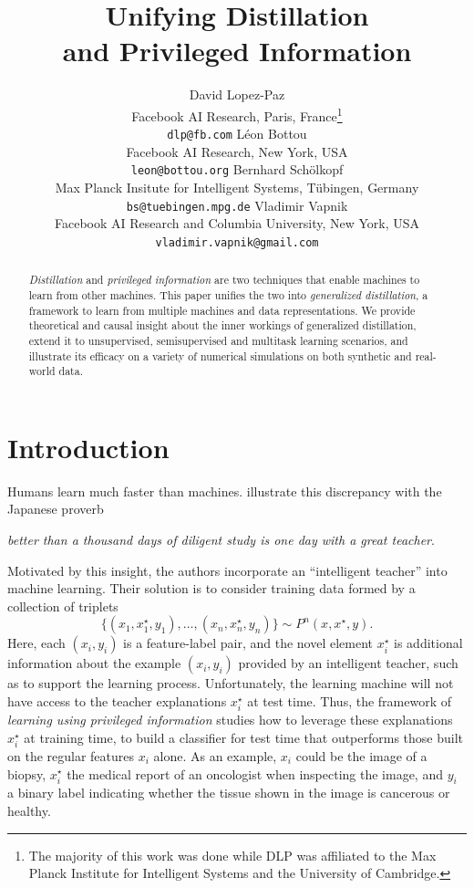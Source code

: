 \documentclass{article}
\title{Unifying Distillation\\and Privileged Information}
\author{David Lopez-Paz\\
  Facebook AI Research, Paris, France\thanks{The majority of this work was done
  while DLP was affiliated to the Max Planck Institute for Intelligent
  Systems and the University of Cambridge.}\\
  \texttt{dlp@fb.com}
  \AND
  L\'eon Bottou\\
  Facebook AI Research, New York, USA\\
  \texttt{leon@bottou.org}
  \AND
  Bernhard Sch\"olkopf\\
  Max Planck Insitute for Intelligent Systems, T\"ubingen, Germany\\
  \texttt{bs@tuebingen.mpg.de}
  \AND
  Vladimir Vapnik\\
  Facebook AI Research and Columbia University, New York, USA\\
  \texttt{vladimir.vapnik@gmail.com}
}
\begin{document}
\maketitle

\begin{abstract}
\emph{Distillation} \citep{Hinton15} and \emph{privileged information}
\citep{VapIzm15} are two techniques that enable machines to learn
from other machines. 
%
This paper unifies the two into
\emph{generalized distillation}, a framework to learn from multiple machines
and data representations.
%
We provide theoretical and causal insight about the inner workings
of generalized distillation, extend it to unsupervised, semisupervised and
multitask learning scenarios, and illustrate its efficacy on a variety of
numerical simulations on both synthetic and real-world data.
\end{abstract}

\section{Introduction}\label{sec:intro}
Humans learn much faster than machines.
\citet{VapIzm15} illustrate this discrepancy with the Japanese proverb
\begin{center}
\emph{better than a thousand days of diligent study is one day with a great
teacher}.
\end{center}
Motivated by this insight, the authors incorporate an
``intelligent teacher'' into machine learning. Their solution 
is to consider training data formed by a collection of triplets
\begin{equation*}
 \{(x_1, x^\star_1, y_1), \ldots, (x_n, x^\star_n, y_n) \} \sim P^n(x,x^\star,y).
\end{equation*}
Here, each $(x_i, y_i)$ is a feature-label pair, and the novel element
$x^\star_i$ is additional information about the example $(x_i, y_i)$ provided
by an intelligent teacher, such as to support the learning process.
Unfortunately, the learning machine will not have access to the teacher
explanations $x^\star_i$ at test time. Thus, the framework of \emph{learning
using privileged information} \citep{Vapnik09,VapIzm15} studies how to leverage
these explanations $x^\star_i$ at training time, to build a classifier for test
time that outperforms those built on the regular features $x_i$
alone. As an example, $x_i$ could be the image of a biopsy, $x^\star_i$ the
medical report of an oncologist when inspecting the image, and $y_i$ a binary
label indicating whether the tissue shown in the image is cancerous or healthy.
\end{document}

